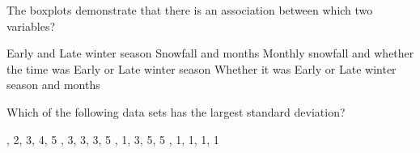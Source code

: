 \documentclass{article}
\begin{document}
\begin{mcquestions}
		\question[follow] The boxplots demonstrate that there is an association between which two variables?
		\begin{mcanswerslist}
			\answer Early and Late winter season
			\answer Snowfall and months
			\answer[correct] Monthly snowfall and whether the time was Early or Late winter season
			\answer Whether it was Early or Late winter season and months
		\end{mcanswerslist}
		
		\question Which of the following data sets has the largest standard deviation?
		\begin{mcanswerslist}
			, 2, 3, 4, 5
			, 3, 3, 3, 5
			, 1, 3, 5, 5
			, 1, 1, 1, 1
		\end{mcanswerslist}
		
	\end{mcquestions}
\end{document}
